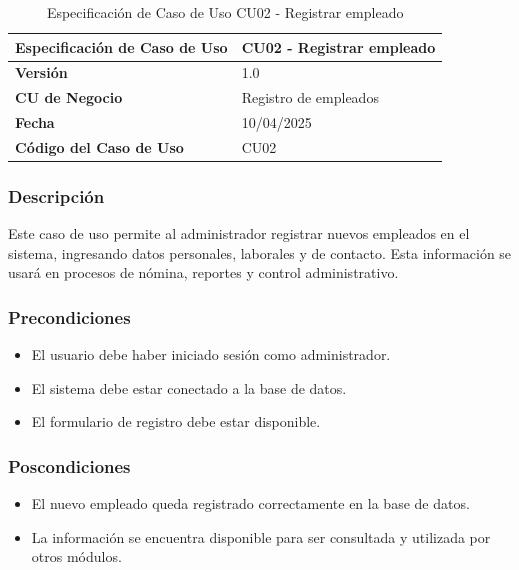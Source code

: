 \begin{table}[h]
	\centering
	\caption{Especificación de Caso de Uso CU02 - Registrar empleado}
	\begin{tabular}{|p{5cm}|p{9cm}|}
		\hline
		\textbf{Especificación de Caso de Uso} & CU02 - Registrar empleado \\ \hline
		\textbf{Versión}                       & 1.0                       \\ \hline
		\textbf{CU de Negocio}                 & Registro de empleados     \\ \hline
		\textbf{Fecha}                         & 10/04/2025                \\ \hline
		\textbf{Código del Caso de Uso}        & CU02                      \\ \hline
	\end{tabular}
\end{table}

\subsubsection*{Descripción}
Este caso de uso permite al administrador registrar nuevos empleados en el sistema, ingresando datos personales, laborales y de contacto. Esta información se usará en procesos de nómina, reportes y control administrativo.

\subsubsection*{Precondiciones}
\begin{itemize}
	\item El usuario debe haber iniciado sesión como administrador.
	\item El sistema debe estar conectado a la base de datos.
	\item El formulario de registro debe estar disponible.
\end{itemize}

\subsubsection*{Poscondiciones}
\begin{itemize}
	\item El nuevo empleado queda registrado correctamente en la base de datos.
	\item La información se encuentra disponible para ser consultada y utilizada por otros módulos.
\end{itemize}


